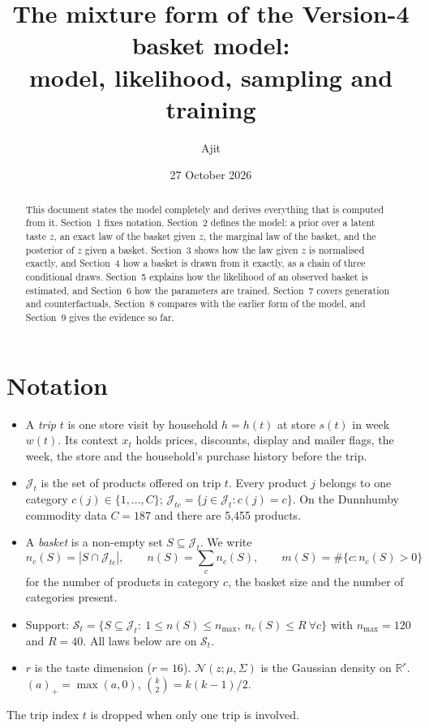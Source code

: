 \documentclass[11pt,a4paper]{article}
\title{The mixture form of the Version-4 basket model:\\ model, likelihood, sampling and training}
\author{Ajit}
\date{27 October 2026}
\theoremstyle{remark}
\newcommand{\N}{\mathcal N}
\newcommand{\R}{\mathbb R}
\newcommand{\pos}[1]{(#1)_+}
\begin{document}
\maketitle

\begin{abstract}
This document states the model completely and derives everything that is computed from it. Section~1
fixes notation. Section~2 defines the model: a prior over a latent taste $z$, an exact law of the basket
given $z$, the marginal law of the basket, and the posterior of $z$ given a basket. Section~3 shows how
the law given $z$ is normalised exactly, and Section~4 how a basket is drawn from it exactly, as a chain of
three conditional draws. Section~5 explains how the likelihood of an observed basket is estimated, and
Section~6 how the parameters are trained. Section~7 covers generation and counterfactuals, Section~8
compares with the earlier form of the model, and Section~9 gives the evidence so far.
\end{abstract}

\tableofcontents

\section{Notation}

\begin{itemize}
\item A \emph{trip} $t$ is one store visit by household $h=h(t)$ at store $s(t)$ in week $w(t)$. Its context
  $x_t$ holds prices, discounts, display and mailer flags, the week, the store and the household's purchase
  history before the trip.
\item $\mathcal J_t$ is the set of products offered on trip $t$. Every product $j$ belongs to one category
  $c(j)\in\{1,\dots,C\}$; $\mathcal J_{tc}=\{j\in\mathcal J_t: c(j)=c\}$. On the Dunnhumby commodity data
  $C=187$ and there are 5{,}455 products.
\item A \emph{basket} is a non-empty set $S\subseteq\mathcal J_t$. We write
  \[
  n_c(S)=|S\cap\mathcal J_{tc}|,\qquad n(S)=\sum_c n_c(S),\qquad m(S)=\#\{c: n_c(S)>0\}
  \]
  for the number of products in category $c$, the basket size and the number of categories present.
\item Support: $\mathcal S_t=\{S\subseteq\mathcal J_t:\ 1\le n(S)\le n_{\max},\ n_c(S)\le R\ \forall c\}$
  with $n_{\max}=120$ and $R=40$. All laws below are on $\mathcal S_t$.
\item $r$ is the taste dimension ($r=16$). $\N(z;\mu,\Sigma)$ is the Gaussian density on $\R^r$.
  $\pos{a}=\max(a,0)$, $\binom{k}{2}=k(k-1)/2$.
\end{itemize}
The trip index $t$ is dropped when only one trip is involved.
\end{document}
